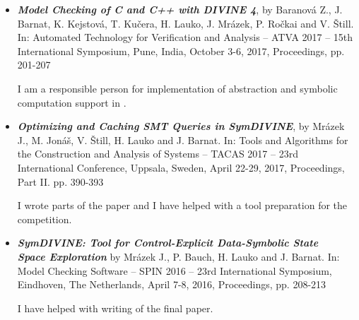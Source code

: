 \begin{itemize}

\item \textbf{\emph{Model Checking of C and C++ with DIVINE 4}},
by Baranová Z., J. Barnat, K. Kejstová, T. Kučera, H. Lauko, J. Mrázek, P. Ročkai and V. Štill.
In: Automated Technology for Verification and Analysis -- ATVA 2017 --
15th International Symposium, Pune, India, October 3-6, 2017,
Proceedings, pp. 201-207~\cite{Divine17}

I am a responsible person for implementation of abstraction and symbolic
computation support in .

\item \emph{\textbf{Optimizing and Caching SMT Queries in SymDIVINE}},
by Mrázek J., M. Jonáš, V. Štill, H. Lauko and J. Barnat.
In: Tools and Algorithms for the Construction and Analysis of Systems -- TACAS 2017 --
23rd International Conference, Uppsala, Sweden, April 22-29, 2017,
Proceedings, Part II. pp. 390-393~\cite{Mrazek2017}

I wrote parts of the paper and I have helped with a tool preparation for the
\svcomp competition.

\item \textbf{\emph{\textsf{SymDIVINE}: Tool for Control-Explicit Data-Symbolic State \\ Space Exploration}}
by Mrázek J., P. Bauch, H. Lauko and J. Barnat.
In: Model Checking Software -- SPIN 2016 -- 23rd International Symposium, Eindhoven, The Netherlands, April 7-8, 2016, Proceedings, pp. 208-213~\cite{Mrazek2016}

I have helped with writing of the final paper.

\end{itemize}
